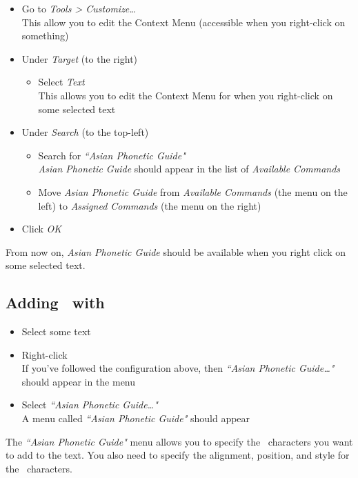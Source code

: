 \begin{itemize}
	\item Go to \emph{Tools > Customize\dots} \\
	This allow you to edit the Context Menu (accessible when you right-click on something)
	
	\item Under \emph{Target} (to the right)
	\begin{itemize}
		\item Select \emph{Text} \\
		This allows you to edit the Context Menu for when you right-click on some selected text
	\end{itemize}

	\item Under \emph{Search} (to the top-left)
	\begin{itemize}
		\item Search for \emph{``Asian Phonetic Guide"} \\
		\emph{Asian Phonetic Guide} should appear in the list of \emph{Available Commands}
		\item Move \emph{Asian Phonetic Guide} from \emph{Available Commands} (the menu on the left) to \emph{Assigned Commands} (the menu on the right)
	\end{itemize}
	\item Click \emph{OK}
\end{itemize}

From now on, \emph{Asian Phonetic Guide} should be available when you right click on some selected text.


\subsection*{Adding \ppinyin\ with \LibreOffice}

\begin{itemize}
	\item Select some text
	\item Right-click \\
	If you've followed the configuration above, then \emph{``Asian Phonetic Guide\dots"} should appear in the menu
	\item Select \emph{``Asian Phonetic Guide\dots"} \\
	A menu called \emph{``Asian Phonetic Guide"} should appear
\end{itemize}

The \emph{``Asian Phonetic Guide"} menu allows you to specify the \rruby\ characters you want to add to the text. 
You also need to specify the alignment, position, and style for the \rruby\ characters. \\


